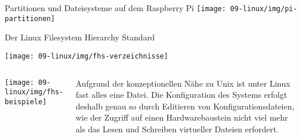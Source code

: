 \begin{frame}{Partitionen und Dateisysteme auf dem Raspberry Pi}
    \texttt{[image: 09-linux/img/pi-partitionen]}
\end{frame}

{
\footnotesize

\begin{frame}[allowframebreaks]{Der Linux Filesystem Hierarchy Standard}
    \begin{center}
        \texttt{[image: 09-linux/img/fhs-verzeichnisse]}
    \end{center}

    \framebreak

    \begin{columns}[T]
        \texttt{[image: 09-linux/img/fhs-beispiele]}

        \parbox{\linewidth}{
            Aufgrund der konzeptionellen Nähe zu Unix ist unter Linux fast alles
            eine Datei. Die Konfiguration des Systems erfolgt deshalb genau so
            durch Editieren von Konfigurationsdateien, wie der Zugriff auf einen
            Hardwarebaustein nicht viel mehr als das Lesen und Schreiben virtueller
            Dateien erfordert.
        }
    \end{columns}
\end{frame}
}

